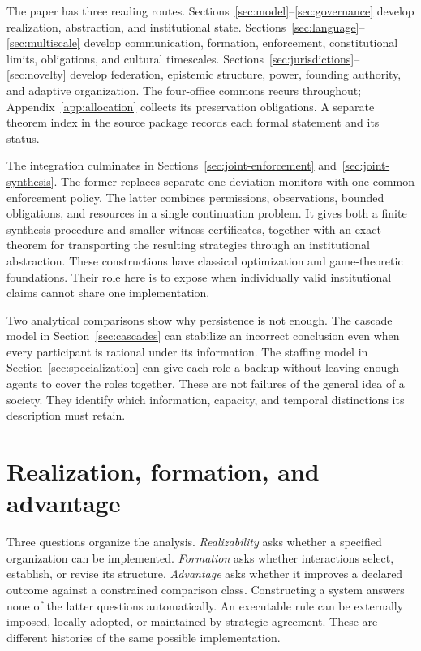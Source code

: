 \documentclass[11pt,letterpaper]{article}
\theoremstyle{plain}
\theoremstyle{definition}
\theoremstyle{remark}
\begin{document}
The paper has three reading routes. Sections~\ref{sec:model}--\ref{sec:governance} develop realization, abstraction, and institutional state. Sections~\ref{sec:language}--\ref{sec:multiscale} develop communication, formation, enforcement, constitutional limits, obligations, and cultural timescales. Sections~\ref{sec:jurisdictions}--\ref{sec:novelty} develop federation, epistemic structure, power, founding authority, and adaptive organization. The four-office commons recurs throughout; Appendix~\ref{app:allocation} collects its preservation obligations. A separate theorem index in the source package records each formal statement and its status.

The integration culminates in Sections~\ref{sec:joint-enforcement} and~\ref{sec:joint-synthesis}. The former replaces separate one-deviation monitors with one common enforcement policy. The latter combines permissions, observations, bounded obligations, and resources in a single continuation problem. It gives both a finite synthesis procedure and smaller witness certificates, together with an exact theorem for transporting the resulting strategies through an institutional abstraction. These constructions have classical optimization and game-theoretic foundations. Their role here is to expose when individually valid institutional claims cannot share one implementation.

Two analytical comparisons show why persistence is not enough. The cascade model in Section~\ref{sec:cascades} can stabilize an incorrect conclusion even when every participant is rational under its information. The staffing model in Section~\ref{sec:specialization} can give each role a backup without leaving enough agents to cover the roles together. These are not failures of the general idea of a society. They identify which information, capacity, and temporal distinctions its description must retain.

\section{Realization, formation, and advantage}\label{sec:scope}
Three questions organize the analysis. \emph{Realizability} asks whether a specified organization can be implemented. \emph{Formation} asks whether interactions select, establish, or revise its structure. \emph{Advantage} asks whether it improves a declared outcome against a constrained comparison class. Constructing a system answers none of the latter questions automatically. An executable rule can be externally imposed, locally adopted, or maintained by strategic agreement. These are different histories of the same possible implementation.
\end{document}
